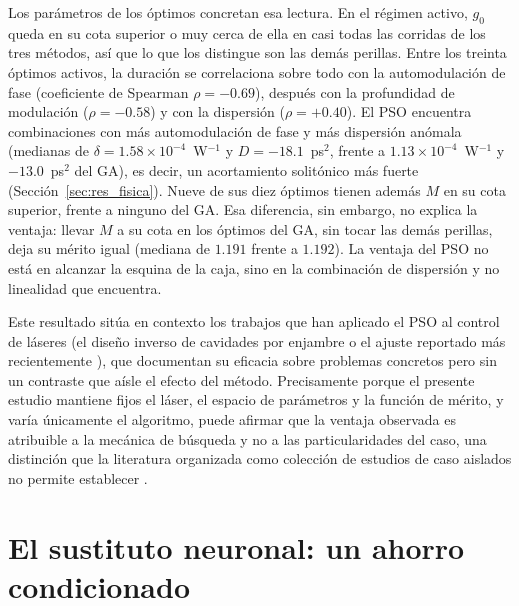Los parámetros de los óptimos concretan esa lectura. En el régimen activo, $g_0$ queda
en su cota superior o muy cerca de ella en casi todas las corridas de los tres métodos,
así que lo que los distingue son las demás perillas. Entre los treinta óptimos activos,
la duración se correlaciona sobre todo con la automodulación de fase (coeficiente de
Spearman $\rho=-0.69$), después con la profundidad de modulación ($\rho=-0.58$) y con la dispersión ($\rho=+0.40$). El PSO encuentra combinaciones con más automodulación de fase
y más dispersión anómala (medianas de $\delta=1.58\times10^{-4}$~W$^{-1}$ y
$D=-18.1$~ps$^2$, frente a $1.13\times10^{-4}$~W$^{-1}$ y $-13.0$~ps$^2$ del GA), es decir,
un acortamiento solitónico más fuerte (Sección~\ref{sec:res_fisica}). Nueve de sus diez
óptimos tienen además $M$ en su cota superior, frente a ninguno del GA. Esa diferencia,
sin embargo, no explica la ventaja: llevar $M$ a su cota en los óptimos del GA, sin
tocar las demás perillas, deja su mérito igual (mediana de $1.191$ frente a $1.192$). La
ventaja del PSO no está en alcanzar la esquina de la caja, sino en la combinación de
dispersión y no linealidad que encuentra.

Este resultado sitúa en contexto los trabajos que han aplicado el PSO al control de
láseres (el diseño inverso de cavidades por enjambre \cite{Kokhanovskiy2021} o el
ajuste reportado más recientemente \cite{Nsoungui2026}), que documentan su eficacia
sobre problemas concretos pero sin un contraste que aísle el efecto del método.
Precisamente porque el presente estudio mantiene fijos el láser, el espacio de
parámetros y la función de mérito, y varía únicamente el algoritmo, puede afirmar que la
ventaja observada es atribuible a la mecánica de búsqueda y no a las particularidades del
caso, una distinción que la literatura organizada como colección de estudios de caso
aislados no permite establecer \cite{Genty2021,Pineau2021}.

\section{El sustituto neuronal: un ahorro condicionado}
\label{sec:res_sustituto}

